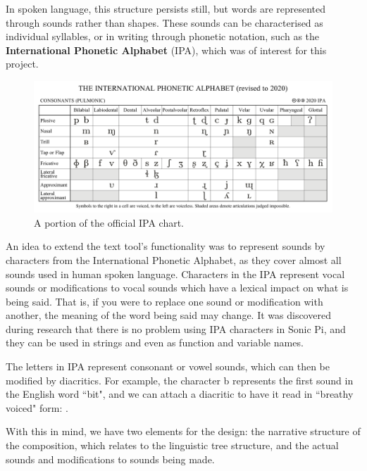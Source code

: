\documentclass[12pt,a4paper,oneside,openright]{report}
\begin{document}
In spoken language, this structure persists still, but words are represented through sounds rather than shapes. These sounds can be characterised as individual syllables, or in writing through phonetic notation, such as the \textbf{International Phonetic Alphabet} (IPA), which was of interest for this project.
\begin{figure}[h]
    \centering
    \includegraphics[scale=0.3]{images/IPA.png}
    \caption{A portion of the official IPA chart.\protect\footnotemark}
    \label{fig:ipa_chart}
\end{figure}

An idea to extend the text tool's functionality was to represent sounds by characters from the International Phonetic Alphabet, as they cover almost all sounds used in human spoken language. Characters in the IPA represent vocal sounds or modifications to vocal sounds which have a lexical impact on what is being said. That is, if you were to replace one sound or modification with another, the meaning of the word being said may change. It was discovered during research that there is no problem using IPA characters in Sonic Pi, and they can be used in strings and even as function and variable names.

The letters in IPA represent consonant or vowel sounds, which can then be modified by diacritics. For example, the character b represents the first sound in the English word ``bit", and we can attach a diacritic to have it read in ``breathy voiced" form: .

With this in mind, we have two elements for the design: the narrative structure of the composition, which relates to the linguistic tree structure, and the actual sounds and modifications to sounds being made.
\end{document}
